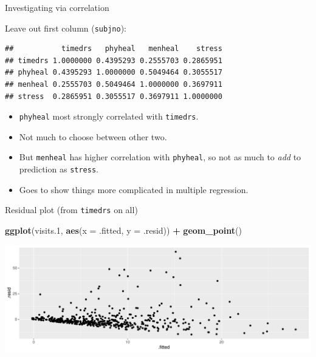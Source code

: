 \documentclass[
  ignorenonframetext,
]{beamer}
\newenvironment{Shaded}{\begin{snugshade}}{\end{snugshade}}
\newcommand{\DataTypeTok}[1]{\textcolor[rgb]{0.13,0.29,0.53}{#1}}
\newcommand{\FloatTok}[1]{\textcolor[rgb]{0.00,0.00,0.81}{#1}}
\newcommand{\KeywordTok}[1]{\textcolor[rgb]{0.13,0.29,0.53}{\textbf{#1}}}
\newcommand{\NormalTok}[1]{#1}
\newcommand{\OperatorTok}[1]{\textcolor[rgb]{0.81,0.36,0.00}{\textbf{#1}}}
\newcommand{\StringTok}[1]{\textcolor[rgb]{0.31,0.60,0.02}{#1}}
\begin{document}
\begin{frame}[fragile]{Investigating via correlation}
\protect\hypertarget{investigating-via-correlation}{}

Leave out first column (\texttt{subjno}):

\begin{Shaded}
\end{Shaded}

\begin{verbatim}
##           timedrs   phyheal   menheal    stress
## timedrs 1.0000000 0.4395293 0.2555703 0.2865951
## phyheal 0.4395293 1.0000000 0.5049464 0.3055517
## menheal 0.2555703 0.5049464 1.0000000 0.3697911
## stress  0.2865951 0.3055517 0.3697911 1.0000000
\end{verbatim}

\begin{itemize}
\item
  \texttt{phyheal} most strongly correlated with \texttt{timedrs}.
\item
  Not much to choose between other two.
\item
  But \texttt{menheal} has higher correlation with \texttt{phyheal}, so
  not as much to \emph{add} to prediction as \texttt{stress}.
\item
  Goes to show things more complicated in multiple regression.
\end{itemize}

\end{frame}

\begin{frame}[fragile]{Residual plot (from \texttt{timedrs} on all)}
\protect\hypertarget{residual-plot-from-timedrs-on-all}{}

\begin{Shaded}
\begin{Highlighting}[]
\KeywordTok{ggplot}\NormalTok{(visits}\FloatTok{.1}\NormalTok{, }\KeywordTok{aes}\NormalTok{(}\DataTypeTok{x =}\NormalTok{ .fitted, }\DataTypeTok{y =}\NormalTok{ .resid)) }\OperatorTok{+}\StringTok{ }\KeywordTok{geom_point}\NormalTok{()}
\end{Highlighting}
\end{Shaded}

\includegraphics{slides_d29_files/figure-beamer/iffy8-1.pdf}

\end{frame}
\end{document}
